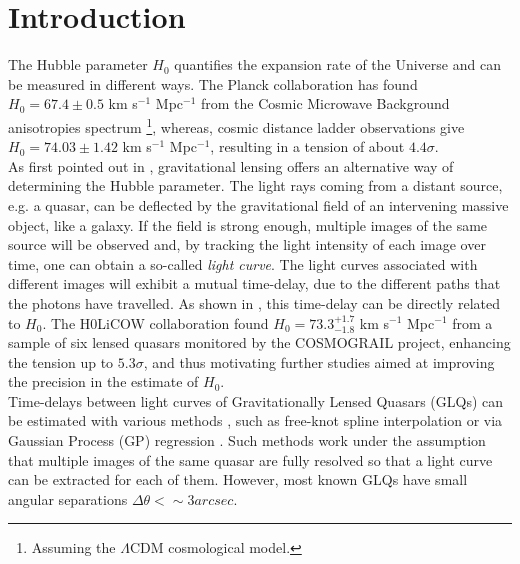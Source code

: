 \documentclass{aa}
\begin{document}

   \maketitle
%

\section{Introduction}
The Hubble parameter $H_0$ quantifies the expansion rate of the Universe and can be measured in different ways. The Planck collaboration \cite{planck} has found $H_0 = 67.4 \pm 0.5$ km s$^{-1}$ Mpc$^{-1}$ from the Cosmic Microwave Background anisotropies spectrum \footnote{Assuming the $\Lambda$CDM cosmological model.}, whereas, cosmic distance ladder observations \cite{cepheid_H0} give $H_0 = 74.03 \pm 1.42$ km s$^{-1}$ Mpc$^{-1}$, resulting in a tension of about $4.4\sigma$.\\ As first pointed out in \cite{Refsdal1964}, gravitational lensing offers an alternative way of determining the Hubble parameter. The light rays coming from a distant source, e.g. a quasar, can be deflected by the gravitational field of an intervening massive object, like a galaxy. If the field is strong enough, multiple images of the same source will be observed and, by tracking the light intensity of each image over time, one can obtain a so-called \emph{light curve}. The light curves associated with different images will exhibit a mutual time-delay, due to the different paths that the photons have travelled. As shown in \cite{Refsdal1964}, this time-delay can be directly related to $H_0$. The H0LiCOW collaboration \cite{H0licow_XIII} found $H_0 = 73.3_{-1.8}^{+1.7}$ km s$^{-1}$ Mpc$^{-1}$ from a sample of six lensed quasars monitored by the COSMOGRAIL \cite{Cosmograil2020} project, enhancing the tension up to $5.3 \sigma$, and thus motivating further studies aimed at improving the precision in the estimate of $H_0$.
\\
Time-delays between light curves of Gravitationally Lensed Quasars (GLQs) can be estimated with various methods \cite{Tewes2013}, such as free-knot spline interpolation \cite{free} or via Gaussian Process (GP) regression \cite{Rasmussen}. Such methods work under the assumption that multiple images of the same quasar are fully resolved so that a light curve can be extracted for each of them. However, most known GLQs \cite{quasars_db} have small angular separations $\Delta\theta < \sim{3}{arcsec}$. 
\end{document}
